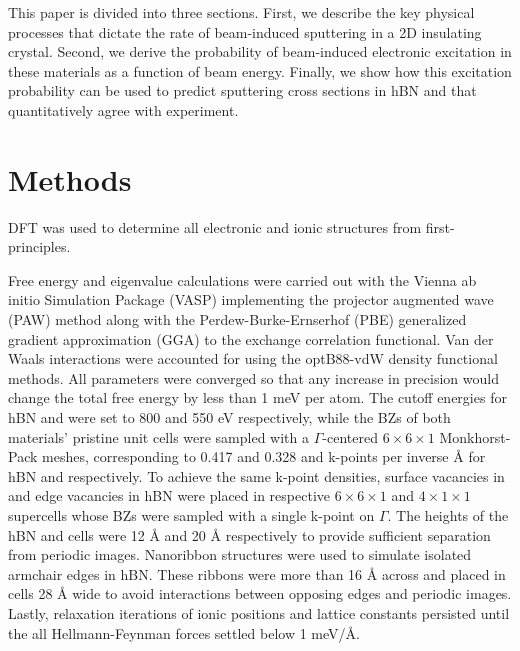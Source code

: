 \documentclass[twoside,twocolumn,9pt]{article}
\begin{document}
This paper is divided into three sections.
First, we describe the key physical processes that dictate the rate of
beam-induced sputtering in a 2D insulating crystal.
Second, we derive the probability of beam-induced electronic excitation in
these materials as a function of beam energy.
Finally, we show how this excitation probability can be used to predict
sputtering cross sections in hBN and  that quantitatively agree with
experiment.

\section{Methods}
\label{sec:methods}

DFT \cite{Hohenberg1964, Kohn1965} was used to determine all electronic and
ionic structures from first-principles.

Free energy and eigenvalue calculations were carried out with the Vienna ab
initio Simulation Package (VASP) \cite{Kresse1996, Kresse1996a} implementing
the projector augmented wave (PAW) method \cite{Blochl1994} along with the
Perdew-Burke-Ernserhof (PBE) generalized gradient approximation (GGA) to the
exchange correlation functional. \cite{Perdew1996}
Van der Waals interactions were accounted for using the optB88-vdW density
functional methods. \cite{Klimes2010, Klimes2011}
All parameters were converged so that any increase in precision would change
the total free energy by less than 1 meV per atom.
The cutoff energies for hBN and  were set to 800 and 550 eV
respectively, while the BZs of both materials' pristine unit cells were sampled
with a $\Gamma$-centered $6\times6\times1$ Monkhorst-Pack meshes,
\cite{Monkhorst1976} corresponding to 0.417 and 0.328 and k-points per inverse
{\AA} for hBN and  respectively.
To achieve the same k-point densities, surface vacancies in  and edge
vacancies in hBN were placed in respective $6\times6\times1$ and
$4\times1\times1$ supercells whose BZs were sampled with a single k-point on
$\Gamma$.
The heights of the hBN and  cells were 12 {\AA} and 20 {\AA}
respectively to provide sufficient separation from periodic images.
Nanoribbon structures were used to simulate isolated armchair edges in hBN.
These ribbons were more than 16 {\AA} across and placed in cells 28 {\AA} wide
to avoid interactions between opposing edges and periodic images.
Lastly, relaxation iterations of ionic positions and lattice constants
persisted until the all Hellmann-Feynman forces settled below 1 
meV/{\AA}.
\end{document}
